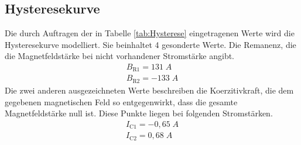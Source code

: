 \documentclass[titlepage = firstcover]{scrartcl}
\begin{document}
        \subsection{Hysteresekurve}
            Die durch Auftragen der in Tabelle \ref{tab:Hysterese} eingetragenen Werte wird die Hysteresekurve modelliert. Sie beinhaltet 4 gesonderte Werte.
            Die Remanenz, die die Magnetfeldstärke bei nicht vorhandener Stromstärke angibt.
            \begin{align}
                B_{\text{R1}} = 131 \; A \\
                B_{\text{R2}} = -133 \; A 
                \label{eqn:Remanenzen}
            \end{align}
            Die zwei anderen ausgezeichneten Werte beschreiben die Koerzitivkraft, die dem gegebenen magnetischen Feld so entgegenwirkt, dass die gesamte
            Magnetfeldstärke null ist. Diese Punkte liegen bei folgenden Stromstärken.
            \begin{align}
                I_{\text{C1}} = -0,65 \; A\\
                I_{\text{C2}} = 0,68 \; A
                \label{eqn:Koerzitiv}
            \end{align} 
\end{document}
